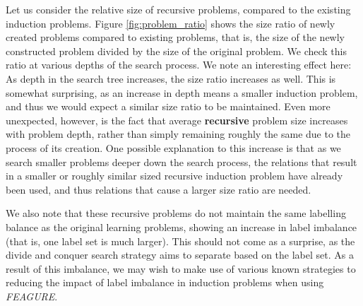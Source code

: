 \documentclass[twoside,11pt]{article}
\theoremstyle{definition}
\begin{document}



Let us consider the relative size of recursive problems, compared to the existing induction problems. Figure \ref{fig:problem_ratio} shows the size ratio of newly created problems compared to existing problems, that is, the size of the newly constructed problem divided by the size of the original problem. We check this ratio at various depths of the search process. We note an interesting effect here:
As depth in the search tree increases, the size ratio increases as well. This is somewhat surprising, as an increase in depth means a smaller induction problem, and thus we would expect a similar size ratio to be maintained. Even more unexpected, however, is the fact that average \textbf{recursive} problem size increases with problem depth, rather than simply remaining roughly the same due to the process of its creation. One possible explanation to this increase is that as we search smaller problems deeper down the search process, the relations that result in a smaller or roughly similar sized recursive induction problem have already been used, and thus relations that cause a larger size ratio are needed.

We also note that these recursive problems do not maintain the same labelling balance as the original learning problems, showing an increase in label imbalance (that is, one label set is much larger). This should not come as a surprise, as the divide and conquer search strategy aims to separate based on the label set. As a result of this imbalance, we may wish to make use of various known strategies to reducing the impact of label imbalance in induction problems when using \emph{FEAGURE}.
\end{document}
